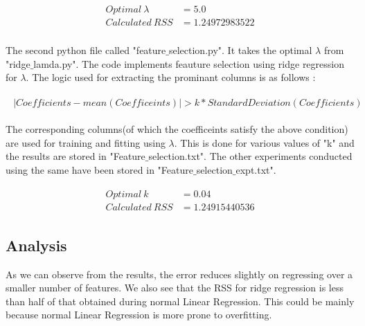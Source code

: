 \documentclass[paper=a4, fontsize=11pt]{scrartcl}
\numberwithin{equation}{section}		%
\numberwithin{figure}{section}			%
\numberwithin{table}{section}				%
\begin{document}
\begin{align} 
	\begin{split}
	Optimal\ \lambda 	&= 5.0\\
	Calculated\ RSS 	&= 1.24972983522\\
	\end{split}					
\end{align}

The second python file called "feature$\_$selection.py". It takes the optimal $\lambda$ from "ridge$\_$lamda.py". The code implements feauture selection using ridge regression for $\lambda$. The logic used for extracting the prominant columns is as follows :
 
\begin{align}
	\begin{split}
	|Coefficients - mean(Coefficeints)| > k*StandardDeviation(Coefficients)
	\end{split}
\end{align}

The corresponding columns(of which the coefficeints satisfy the above condition) are used for training and fitting using $\lambda$. This is done for various values of "k" and the results are stored in "Feature$\_$selection.txt". The other experiments conducted using the same have been stored in "Feature$\_$selection$\_$expt.txt".

\begin{align} 
	\begin{split}
	Optimal\ k 	&= 0.04\\
	Calculated\ RSS 	&= 1.24915440536
	\end{split}					
\end{align}

\subsection{Analysis}
As we can observe from the results, the error reduces slightly on regressing over a smaller number of features. We also see that the RSS for ridge regression is less than half of that obtained during normal Linear Regression. This could be mainly because normal Linear Regression is more prone to overfitting.
\end{document}
